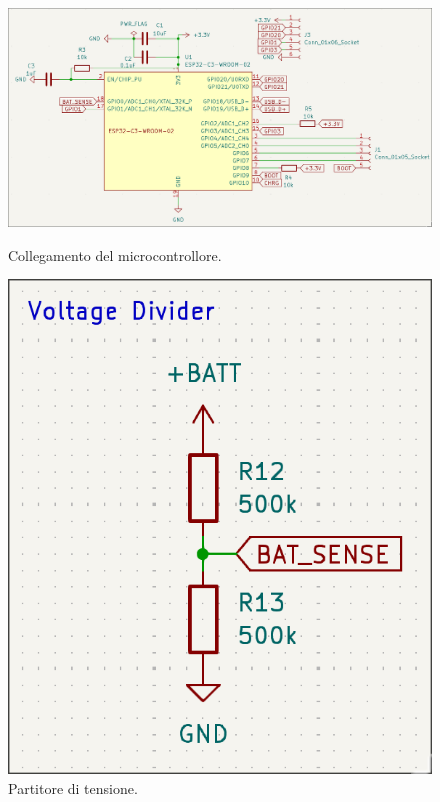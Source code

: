 \begin{figure}[H]
    \centering
    \begin{minipage}[b]{0.70\textwidth}
        \includegraphics[width=1.0\textwidth]{images/chapter2/mcu.png}
        \caption{Collegamento del microcontrollore.}\label{fig:mcu}
    \end{minipage}
    \hfill
    \begin{minipage}[b]{0.28\textwidth}
        \includegraphics[width=1.0\textwidth]{images/chapter2/divider.png}
        \caption{Partitore di tensione.}\label{fig:divider}
        \end{minipage}
\end{figure}


